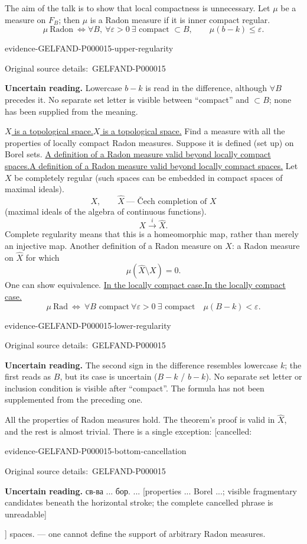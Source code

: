 \documentclass[11pt]{article}
\let\MathUnderline\underline
\renewcommand{\underline}[1]{\ifmmode\MathUnderline{#1}\else\uline{#1}\fi}
\newcommand{\EvidenceBlock}[4]{%
 \par\smallskip\noindent\begin{minipage}{\linewidth}
 \begin{minipage}[t]{.47\linewidth}\vspace{0pt}\centering
 \csname evidence-#1-#2\endcsname\par
 {\scriptsize\SourceCropCaption\ #1}\par
 \end{minipage}\hfill
 \begin{minipage}[t]{.49\linewidth}\vspace{0pt}\raggedright
 {\small\color{orange!65!black}\textbf{#4} #3}\par
 \end{minipage}
 \end{minipage}\par\smallskip}
\newcommand{\Unclear}[3]{\EvidenceBlock{#1}{#2}{#3}{\ReadingCaption}}
\newcommand{\SourceCropCaption}{Original source details:}\newcommand{\ReadingCaption}{Uncertain reading.}\newcommand{\IncompleteCaption}{Undeciphered passage.}\newcommand{\DiagramCaption}{Diagram and typed description.}
\begin{document}
The aim of the talk is to show that local compactness is unnecessary.
Let $\mu$ be a measure on $F_B$; then $\mu$ is a Radon measure if it is inner compact regular.
\begin{equation*}
\mu\ \text{Radon}\ \Longleftrightarrow
\forall B,\ \forall\varepsilon>0\ \exists\text{ compact }\subset B,\qquad
\mu(b-k)\leq\varepsilon.
\end{equation*}
\Unclear{GELFAND-P000015}{upper-regularity}{Lowercase $b-k$ is read in the difference, although $\forall B$ precedes it. No separate set letter is visible between “compact” and $\subset B$; none has been supplied from the meaning.}
[Horizontal divider.]

\underline{$X$ is a topological space.}
Find a measure with all the properties of locally compact Radon measures.
Suppose it is defined (set up) on Borel sets.
\underline{A definition of a Radon measure valid beyond locally compact spaces.}
Let $X$ be completely regular (such spaces can be embedded in compact spaces of maximal ideals).
\begin{equation*}
X,\qquad \widehat X\ \text{--- Čech completion of }X
\end{equation*}
(maximal ideals of the algebra of continuous functions).
\begin{equation*}
X\overset i\longrightarrow\widehat X.
\end{equation*}
Complete regularity means that this is a homeomorphic map, rather than merely an injective map.
Another definition of a Radon measure on $X$: a Radon measure on $\widehat X$ for which
\begin{equation*}
\mu(\widehat X\setminus X)=0.
\end{equation*}
One can show equivalence.
\underline{In the locally compact case.}
\begin{equation*}
\mu\ \mathrm{Rad}\ \Longleftrightarrow\ \forall B\text{ compact}\ \forall\varepsilon>0\ \exists\text{ compact}\quad
\mu(B-k)<\varepsilon.
\end{equation*}
\Unclear{GELFAND-P000015}{lower-regularity}{The second sign in the difference resembles lowercase $k$; the first reads as $B$, but its case is uncertain ($B-k$ / $b-k$). No separate set letter or inclusion condition is visible after “compact”. The formula has not been supplemented from the preceding one.}
All the properties of Radon measures hold.
The theorem's proof is valid in $\widehat X$, and the rest is almost trivial.
There is a single exception: [cancelled: \Unclear{GELFAND-P000015}{bottom-cancellation}{св-ва ... бор. ... [properties ... Borel ...; visible fragmentary candidates beneath the horizontal stroke; the complete cancelled phrase is unreadable]}] spaces.
--- one cannot define the support of arbitrary Radon measures.
\end{document}
